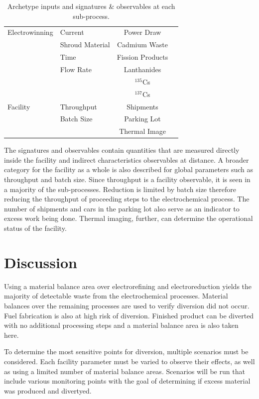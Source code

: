 \documentclass{anstrans}
\begin{document}
\begin{table}[h]
\begin{tabularx}{0.5\textwidth}{llcr}
		Electrowinning & Current & Power Draw & \cite{flowsheet_1998} \\
		& Shroud Material & Cadmium Waste & \cite{lee_korean_2011} \\
		& Time & Fission Products & \cite{Borrelli_2017} \\
		& Flow Rate & Lanthanides & \\
		&  & $^{135}$Cs & \\
		&  & $^{137}$Cs & \\ \hline
		Facility & Throughput & Shipments & \\
		& Batch Size & Parking Lot & \\
		& & Thermal Image & \\
		\hline
	\end{tabularx}
	\caption {Archetype inputs and signatures \& observables at each sub-process.}
	\label {tab:params}
\end{table}

The signatures and observables contain quantities that are measured directly inside
the facility and indirect characteristics observables at distance. A broader category for the facility as a whole is also described for global parameters such as
throughput and batch size. Since throughput is a facility observable, 
it is seen in a majority of the sub-processes. Reduction is limited by 
batch size therefore reducing the throughput of proceeding steps to the 
electrochemical process. The number of shipments and cars in the parking lot also serve as an indicator to excess work being done. Thermal imaging, further, can
determine the operational status of the facility. 


\section{Discussion}
Using a material balance area over electrorefining and electroreduction yields the majority of detectable waste from 
the electrochemical processes.  Material balances over the remaining 
processes are used to verify diversion did not occur. Fuel fabrication is also at high risk of diversion. Finished product can be diverted with no additional 
processing steps and a material balance area is also taken here. 

To determine the most sensitive points for diversion, multiple scenarios must be considered. 
Each facility parameter must be varied to observe their effects, as well as using a limited number of material balance areas. 
Scenarios will be run that include various monitoring points with the goal of determining if excess material was produced 
and divertyed. 
\end{document}
